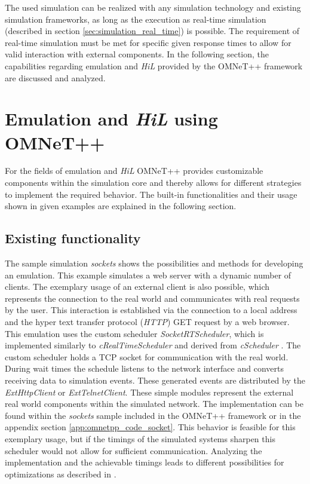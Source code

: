 The used simulation can be realized with any simulation technology and existing simulation frameworks, as long as the execution as real-time simulation (described in section \ref{sec:simulation_real_time}) is possible.
The requirement of real-time simulation must be met for specific given response times to allow for valid interaction with external components.
In the following section, the capabilities regarding emulation and \emph{HiL} provided by the OMNeT++ framework are discussed and analyzed.

\section{Emulation and \emph{HiL} using OMNeT++}
\label{sec:emulation_omnet}
For the fields of emulation and \emph{HiL} OMNeT++ provides customizable components within the simulation core and thereby allows for different strategies to implement the required behavior.
The built-in functionalities and their usage shown in given examples are explained in the following section.

\subsection{Existing functionality}
\label{sec:emulation_omnet_existing}

The sample simulation \emph{sockets} shows the possibilities and methods for developing an emulation.
This example simulates a web server with a dynamic number of clients.
The exemplary usage of an external client is also possible, which represents the connection to the real world and communicates with real requests by the user.
This interaction is established via the connection to a local address and the hyper text transfer protocol (\emph{HTTP}) GET request by a web browser.
This emulation uses the custom scheduler \emph{SocketRTScheduler}, which is implemented similarly to \emph{cRealTimeScheduler} and derived from \emph{cScheduler}  \cite{omnet_api}.
The custom scheduler holds a TCP socket for communication with the real world.
During wait times the schedule listens to the network interface and converts receiving data to simulation events.
These generated events are distributed by the \emph{ExtHttpClient} or \emph{ExtTelnetClient}.
These simple modules represent the external real world components within the simulated network.
The implementation can be found within the \emph{sockets} sample included in the OMNeT++ framework or in the appendix section \ref{app:omnetpp_code_socket}.
This behavior is feasible for this exemplary usage, but if the timings of the simulated systems sharpen this scheduler would not allow for sufficient communication.
Analyzing the implementation and the achievable timings leads to different possibilities for optimizations as described in \cite{scussel_improvements_2015}.

